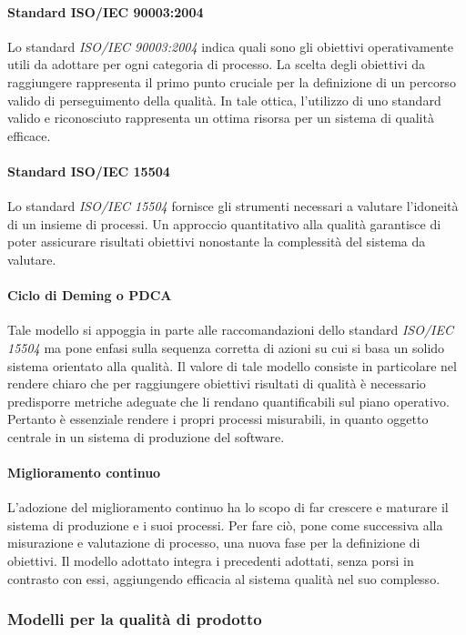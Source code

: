 \documentclass[12pt,a4paper]{article}
\begin{document}
	\paragraph{Standard ISO/IEC 90003:2004}
	Lo standard \textit{ISO/IEC 90003:2004} indica quali sono gli obiettivi operativamente utili da adottare per ogni categoria di processo. La scelta degli obiettivi da raggiungere rappresenta il primo punto cruciale per la definizione di un percorso valido di perseguimento della qualità. In tale ottica, l'utilizzo di uno standard valido e riconosciuto rappresenta un ottima risorsa per un sistema di qualità efficace.
	
	\paragraph{Standard ISO/IEC 15504}
	Lo standard \textit{ISO/IEC 15504} fornisce gli strumenti necessari a valutare l'idoneità di un insieme di processi. Un approccio quantitativo alla qualità garantisce di poter assicurare risultati obiettivi nonostante la complessità del sistema da valutare.
	
	\paragraph{Ciclo di Deming o PDCA}
	Tale modello si appoggia in parte alle raccomandazioni dello standard \textit{ISO/IEC 15504} ma pone enfasi sulla sequenza corretta di azioni su cui si basa un solido sistema orientato alla qualità. Il valore di tale modello consiste in particolare nel rendere chiaro che per raggiungere obiettivi risultati di qualità è necessario predisporre metriche adeguate che li rendano quantificabili sul piano operativo. Pertanto è essenziale rendere i propri processi misurabili, in quanto oggetto centrale in un sistema di produzione del software.
	
	\paragraph{Miglioramento continuo}
	L'adozione del miglioramento continuo ha lo scopo di far crescere e maturare il sistema di produzione e i suoi processi. Per fare ciò, pone come successiva alla misurazione e valutazione di processo, una nuova fase per la definizione di obiettivi. Il modello adottato integra i precedenti adottati, senza porsi in contrasto con essi, aggiungendo efficacia al sistema qualità nel suo complesso.
	
	\subsubsection{Modelli per la qualità di prodotto}
	
\end{document}
